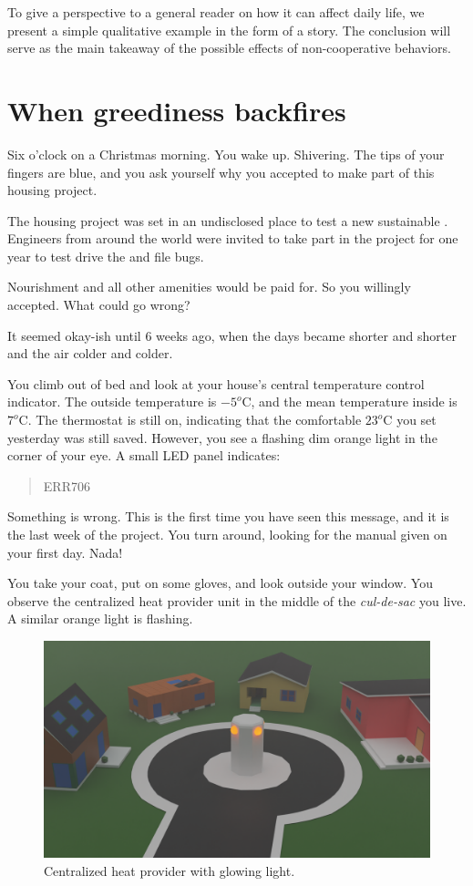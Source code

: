 \documentclass[../main.tex]{subfiles}
\begin{document}
To give a perspective to a general reader on how it can affect daily life, we present a simple qualitative example in the form of a story. The conclusion will serve as the main takeaway of the possible effects of non-cooperative behaviors.
\newpage
\section{When greediness backfires}
Six o'clock on a Christmas morning.
You wake up.
Shivering.
The tips of your fingers are blue, and you ask yourself why you accepted to make part of this housing project.

The housing project was set in an undisclosed place to test a new sustainable \dhn{}.
Engineers from around the world were invited to take part in the project for one year to test drive the \dhn{} and file bugs.

Nourishment and all other amenities would be paid for.
So you willingly accepted.
What could go wrong?

It seemed okay-ish until $6$ weeks ago, when the days became shorter and shorter and the air colder and colder.

You climb out of bed and look at your house's central temperature control indicator. The outside temperature is $-5^{o}$C, and the mean temperature inside is $7^{o}$C.
The thermostat is still on, indicating that the comfortable $23^{o}$C you set yesterday was still saved. However, you see a flashing dim orange light in the corner of your eye. A small LED panel indicates:
\begin{quote}
ERR706
\end{quote}

Something is wrong.
This is the first time you have seen this message, and it is the last week of the project.
You turn around, looking for the manual given on your first day. Nada!

You take your coat, put on some gloves, and look outside your window.
You observe the centralized heat provider unit in the middle of the \emph{cul-de-sac} you live.
\\A similar orange light is flashing.
\begin{figure}[H]
  \centering
  \includegraphics[width=.75\textwidth]{../img/district_3d.png}
  \caption{Centralized heat provider with glowing light.}\label{fig:culdesac}
\end{figure}
\end{document}
